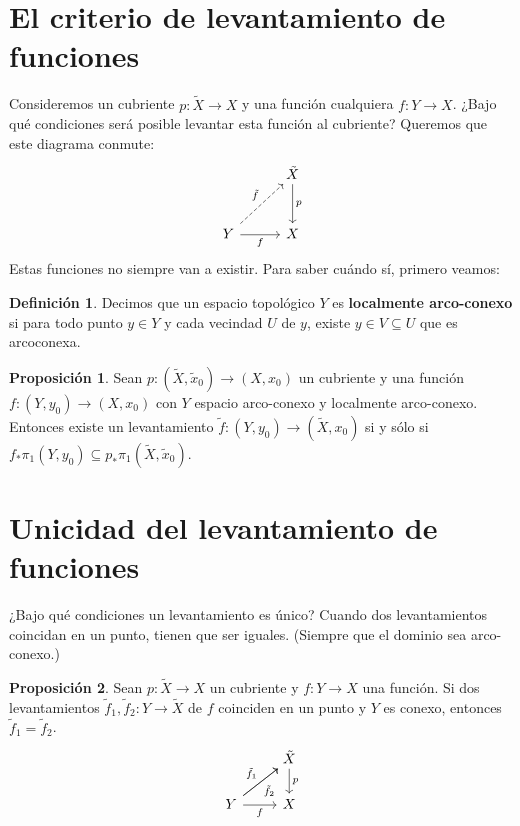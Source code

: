 \documentclass[spanish]{book}
\theoremstyle{definition}
\newtheorem*{defn}{Definición}
\newtheorem*{prop}{Proposición}
\begin{document}
\section{El criterio de levantamiento de funciones}
Consideremos un cubriente $p:\tilde{X}\to X$ y una función cualquiera $f:Y\to X$. ¿Bajo qué condiciones será posible levantar esta función al cubriente? Queremos que este diagrama conmute:
\[\begin{tikzcd}[column sep=1cm,row sep=1cm]
	&\tilde{X}\arrow[d,"p"]\\
	Y\arrow[ur,dashed,"\tilde{f}"]\arrow[r,swap,"f"]&X
\end{tikzcd}\]
Estas funciones no siempre van a existir. Para saber cuándo sí, primero veamos:
\begin{defn}
	Decimos que un espacio topológico $Y$ es \textbf{localmente arco-conexo} si para todo punto $y\in Y$ y cada vecindad $U$ de $y$, existe $y\in V\subseteq U$ que es arcoconexa.
\end{defn}
\begin{prop}
	Sean $p:(\tilde{X},\tilde{x}_0)\to (X,x_0)$ un cubriente y una función $f:(Y,y_0)\to (X,x_0)$ con $Y$ espacio arco-conexo y localmente arco-conexo. Entonces existe un levantamiento $\tilde{f}:(Y,y_0)\to(\tilde{X},x_0)$ si y sólo si $f_*\pi_1(Y,y_0)\subseteq p_*\pi_1(\tilde{X},\tilde{x}_0)$.
\end{prop}
\section{Unicidad del levantamiento de funciones}
	¿Bajo qué condiciones un levantamiento es único? Cuando dos levantamientos coincidan en un punto, tienen que ser iguales. (Siempre que el dominio sea arco-conexo.)
	
	\begin{prop}
		Sean $p:\tilde{X}\to X$ un cubriente y $f:Y\to X$ una función. Si dos levantamientos $\tilde{f}_1,\tilde{f}_2:Y\to\tilde{X}$ de $f$ coinciden en un punto y $Y$ es conexo, entonces $\tilde{f}_1=\tilde{f}_2$.
		\[\begin{tikzcd}
				&\tilde{X}\arrow[d,"p"]\\
				Y\arrow[ru,"\tilde{f}_1"]\arrow[ru,swap,"\tilde{f}_2"]\arrow[r,swap,"f"]&X
			\end{tikzcd}\]
	\end{prop}



\end{document}
